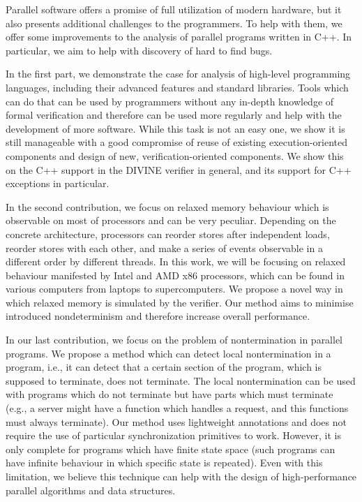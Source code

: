 Parallel software offers a promise of full utilization of modern hardware,
but it also presents additional challenges to the programmers.
To help with them, we offer some improvements to the analysis of parallel
programs written in C++.
In particular, we aim to help with discovery of hard to find bugs.

In the first part, we demonstrate the case for analysis of high-level
programming languages, including their advanced features and standard
libraries.
Tools which can do that can be used by programmers without any in-depth
knowledge of formal verification and therefore can be used more regularly and
help with the development of more software.
While this task is not an easy one, we show it is still manageable with a good
compromise of reuse of existing execution-oriented components and design of
new, verification-oriented components.
We show this on the C++ support in the DIVINE verifier in general, and its
support for C++ exceptions in particular.

In the second contribution, we focus on relaxed memory behaviour which is
observable on most of processors and can be very peculiar.
Depending on the concrete architecture, processors can reorder stores after
independent loads, reorder stores with each other, and make a series of events
observable in a different order by different threads.
In this work, we will be focusing on relaxed behaviour manifested by Intel and
AMD x86 processors, which can be found in various computers from laptops to
supercomputers.
We propose a novel way in which relaxed memory is simulated by the verifier.
Our method aims to minimise introduced nondeterminism and therefore increase
overall performance.

In our last contribution, we focus on the problem of nontermination in parallel
programs.
We propose a method which can detect local nontermination in a program, i.e.,
it can detect that a certain section of the program, which is supposed to
terminate, does not terminate.
The local nontermination can be used with programs which do not terminate but
have parts which must terminate (e.g., a server might have a function which
handles a request, and this functions must always terminate).
Our method uses lightweight annotations and does not require the use of
particular synchronization primitives to work.
However, it is only complete for programs which have finite state space (such
programs can have infinite behaviour in which specific state is repeated).
Even with this limitation, we believe this technique can help with the design
of high-performance parallel algorithms and data structures.

